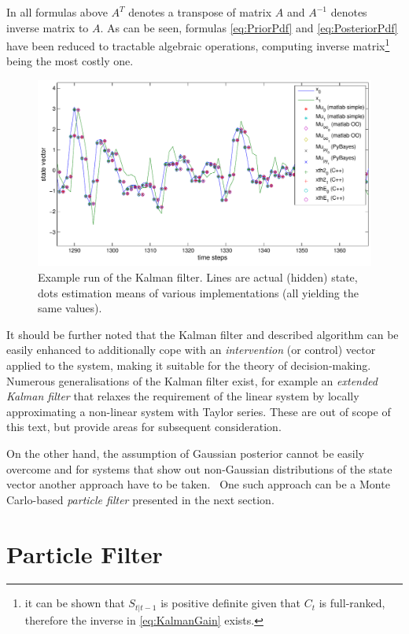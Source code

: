 In all formulas above \(A^T\) denotes a transpose of matrix \(A\) and \(A^{-1}\) denotes inverse
matrix to \(A\). As can be seen, formulas \eqref{eq:PriorPdf} and \eqref{eq:PosteriorPdf} have
been reduced to tractable algebraic operations, computing inverse matrix\footnote{it can be shown
that \(S_{t|t-1}\) is positive definite given that \(C_t\) is full-ranked,
therefore the inverse in \eqref{eq:KalmanGain} exists.} being the most costly one.

\begin{figure}[h]
	\centering
	\includegraphics[width=\textwidth,keepaspectratio=true]{KF.pdf}
	\caption[Example run of the Kalman filter]{Example run of the Kalman filter. Lines are actual
	(hidden) state, dots estimation means of various implementations (all yielding the same values).}
	\label{fig:KF}
\end{figure}

It should be further noted that the Kalman filter and described algorithm can be easily enhanced to
additionally cope with an \emph{intervention} (or control) vector applied to the system, making it
suitable for the theory of decision-making. Numerous generalisations of the Kalman filter exist, for
example an \emph{extended Kalman filter} that relaxes the requirement of the linear system by locally
approximating a non-linear system with Taylor series. These are out of scope of this
text, but provide areas for subsequent consideration.

On the other hand, the assumption of Gaussian posterior {\pdf} cannot be easily overcome and for
systems that show out non-Gaussian distributions of the state vector another approach have to be
taken.~\cite{AruMasGor:02} One such approach can be a Monte Carlo-based \emph{particle filter}
presented in the next section.

\section{Particle Filter} \label{sec:ParticleFilter}

